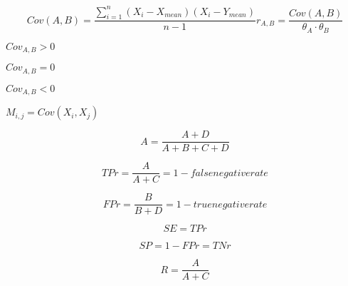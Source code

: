 \documentclass[10pt]{book}
\begin{document}
\begin{mdSnippets}
\begin{mdDisplaySnippet}
\[%
Cov(A,B) = \frac{\sum_{i=1}^n (X_i - X_{mean})(X_i - Y_{mean})}{n - 1}
r_{A,B} = \frac{Cov(A,B)}{\theta_A \cdot \theta_B}
\]%
\end{mdDisplaySnippet}%
\begin{mdInlineSnippet}[fce83cb02a2dc0be2e78f898f2859411]%
$Cov_{A, B} > 0$\end{mdInlineSnippet}%
\begin{mdInlineSnippet}%
$Cov_{A, B} = 0$\end{mdInlineSnippet}%
\begin{mdInlineSnippet}[7e88034e872fce6d1d2bd902a882a0df]%
$Cov_{A, B} < 0$\end{mdInlineSnippet}%
\begin{mdInlineSnippet}[ab74442f4873888a9501dff0ec96ac61]%
$M_{i,j} = Cov(X_i, X_j)$\end{mdInlineSnippet}%
\begin{mdDisplaySnippet}%
\[%
  A = \frac{A+D}{A+B+C+D}
\]%
\end{mdDisplaySnippet}%
\begin{mdDisplaySnippet}%
\[%
  TPr = \frac{A}{A+C} = 1 - false negative rate
\]%
\end{mdDisplaySnippet}%
\begin{mdDisplaySnippet}[1a30e46ff79f03c56b8e98cb9ca6c59d]%
\[%
  FPr = \frac{B}{B+D} = 1 - true negative rate
\]%
\end{mdDisplaySnippet}%
\begin{mdDisplaySnippet}[2e81f3d8720b764e16a9f1f4b4a4cc02]%
\[%
  SE = TPr
\]%
\end{mdDisplaySnippet}%
\begin{mdDisplaySnippet}%
\[%
  SP = 1 - FPr = TNr
\]%
\end{mdDisplaySnippet}%
\begin{mdDisplaySnippet}[ba82f48a43ef0894d62cc5c64647ffde]%
\[%
  R = \frac{A}{A+C}
\]%
\end{mdDisplaySnippet}%
\begin{mdDisplaySnippet}%

\end{mdDisplaySnippet}
\end{mdSnippets}
\end{document}
